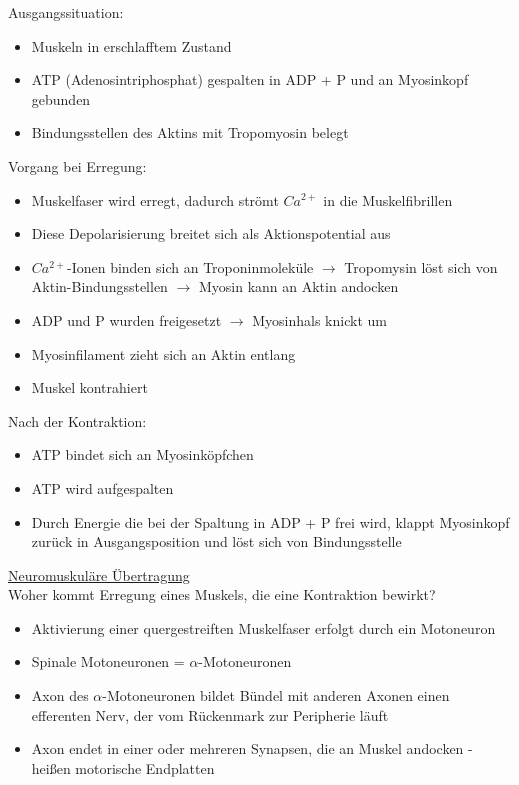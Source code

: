 \documentclass[a4paper,10pt,oneside]{article}
\begin{document}
Ausgangssituation:
	\begin{itemize}
		\item Muskeln in erschlafftem Zustand
		\item ATP (Adenosintriphosphat) gespalten in ADP + P und an Myosinkopf gebunden
		\item Bindungsstellen des Aktins mit Tropomyosin belegt
	\end{itemize}

Vorgang bei Erregung:
	\begin{itemize}
		\item Muskelfaser wird erregt, dadurch strömt $Ca^{2+}$ in die Muskelfibrillen
		\item Diese Depolarisierung breitet sich als Aktionspotential aus
		\item $Ca^{2+}$-Ionen binden sich an Troponinmoleküle $\rightarrow$ Tropomysin löst sich von Aktin-Bindungsstellen $\rightarrow$ Myosin kann an Aktin andocken
		\item ADP und P wurden freigesetzt $\rightarrow$ Myosinhals knickt um
		\item Myosinfilament zieht sich an Aktin entlang
		\item Muskel kontrahiert
	\end{itemize}

Nach der Kontraktion:
	\begin{itemize}
		\item ATP bindet sich an Myosinköpfchen
		\item ATP wird aufgespalten
		\item Durch Energie die bei der Spaltung in ADP + P frei wird, klappt Myosinkopf zurück in Ausgangsposition und löst sich von Bindungsstelle
	\end{itemize}
	
\underline{Neuromuskuläre Übertragung} \\
Woher kommt Erregung eines Muskels, die eine Kontraktion bewirkt?
	\begin{itemize}
		\item Aktivierung einer quergestreiften Muskelfaser erfolgt durch ein Motoneuron
		\item Spinale Motoneuronen = $\alpha$-Motoneuronen
		\item Axon des $\alpha$-Motoneuronen bildet Bündel mit anderen Axonen einen efferenten Nerv, der vom Rückenmark zur Peripherie läuft
		\item Axon endet in einer oder mehreren Synapsen, die an Muskel andocken - heißen motorische Endplatten
	\end{itemize}
	
\end{document}
